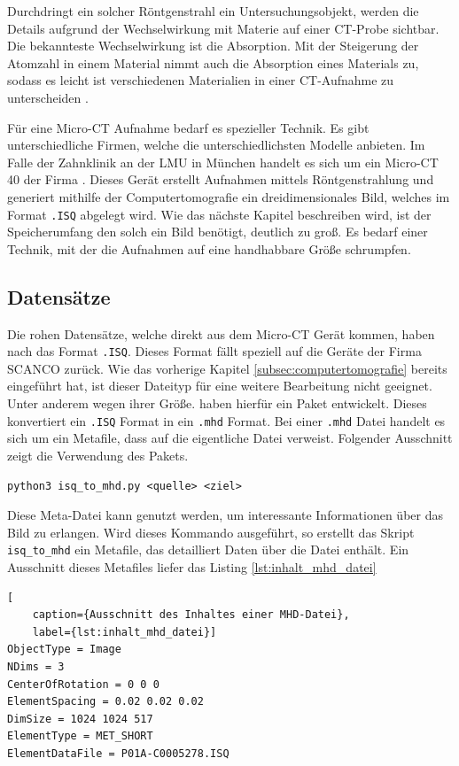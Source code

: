 Durchdringt ein solcher Röntgenstrahl ein Untersuchungsobjekt, werden die
Details aufgrund der Wechselwirkung mit Materie auf einer CT-Probe sichtbar. Die
bekannteste Wechselwirkung ist die Absorption. Mit der Steigerung der Atomzahl
in einem Material nimmt auch die Absorption eines Materials zu, sodass es leicht
ist verschiedenen Materialien in einer CT-Aufnahme zu unterscheiden \citep[vgl.][]{nib2024}.

Für eine Micro-CT Aufnahme bedarf es spezieller Technik. Es gibt unterschiedliche
Firmen, welche die unterschiedlichsten Modelle anbieten. Im Falle der Zahnklinik
an der LMU in München handelt es sich um ein Micro-CT 40 der Firma \citet{scanco2024}.
Dieses Gerät erstellt Aufnahmen mittels Röntgenstrahlung und generiert mithilfe der
Computertomografie ein dreidimensionales Bild, welches im Format \texttt{.ISQ} abgelegt
wird. Wie das nächste Kapitel beschreiben wird, ist der Speicherumfang den solch
ein Bild benötigt, deutlich zu groß. Es bedarf einer Technik, mit der die
Aufnahmen auf eine handhabbare Größe schrumpfen.

\subsection{Datensätze}
\label{subsec:datensätze} Die rohen Datensätze, welche direkt aus dem Micro-CT Gerät
kommen, haben nach \citet{scanco2024} das Format \texttt{.ISQ}. Dieses Format fällt
speziell auf die Geräte der Firma SCANCO zurück. Wie das vorherige Kapitel
\ref{subsec:computertomografie} bereits eingeführt hat, ist dieser Dateityp für eine
weitere Bearbeitung nicht geeignet. Unter anderem wegen ihrer Größe. \citet{RoeschKunzelmann2018}
haben hierfür ein Paket entwickelt. Dieses konvertiert ein \texttt{.ISQ} Format
in ein \texttt{.mhd} Format. Bei einer \texttt{.mhd} Datei handelt es sich um ein
Metafile, dass auf die eigentliche Datei verweist. Folgender Ausschnitt zeigt die
Verwendung des Pakets.

\texttt{python3 isq\_to\_mhd.py <quelle> <ziel>}

Diese Meta-Datei kann genutzt werden, um interessante Informationen über das
Bild zu erlangen. Wird dieses Kommando ausgeführt, so erstellt das Skript
\texttt{isq\_to\_mhd} ein Metafile, das detailliert Daten über die Datei enthält.
Ein Ausschnitt dieses Metafiles liefer das Listing \ref{lst:inhalt_mhd_datei}

\begin{lstlisting}[
	caption={Ausschnitt des Inhaltes einer MHD-Datei},
	label={lst:inhalt_mhd_datei}]
ObjectType = Image
NDims = 3
CenterOfRotation = 0 0 0
ElementSpacing = 0.02 0.02 0.02
DimSize = 1024 1024 517
ElementType = MET_SHORT
ElementDataFile = P01A-C0005278.ISQ
\end{lstlisting}

